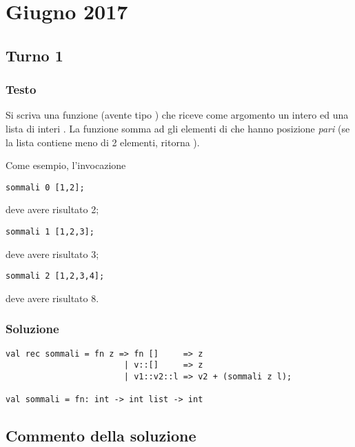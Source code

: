 \section{Giugno 2017}

\subsection{Turno 1}

\subsubsection{Testo}

Si scriva una funzione  (avente tipo ) che riceve come argomento un intero  ed una lista di interi .
La funzione  somma ad  gli elementi di  che hanno posizione \emph{pari} (se la lista contiene meno di 2 elementi,  ritorna ).

\medskip
Come esempio, l'invocazione

\begin{lstlisting}
sommali 0 [1,2];
\end{lstlisting}

deve avere risultato 2;

\begin{lstlisting}
sommali 1 [1,2,3];
\end{lstlisting}

deve avere risultato 3;

\begin{lstlisting}
sommali 2 [1,2,3,4];
\end{lstlisting}

deve avere risultato 8.

\subsubsection{Soluzione}

\begin{lstlisting}[style = SML, caption = {[Definizione della funzione \sml{sommali} - Turno 1]Definizione della funzione \sml{sommali}}]
val rec sommali = fn z => fn []     => z
						| v::[]     => z
						| v1::v2::l => v2 + (sommali z l);

val sommali = fn: int -> int list -> int
\end{lstlisting}

\subsection{Commento della soluzione}

